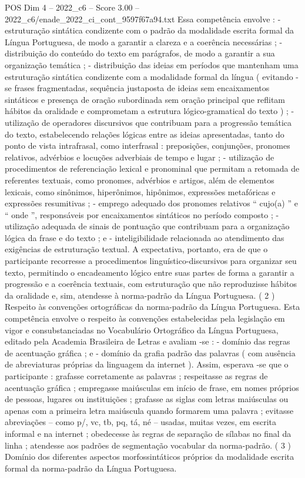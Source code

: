 \begin{textsample}{POS Dim 4 – 2022\_c6 – Score 3.00 – 2022\_c6/enade\_2022\_ci\_cont\_9597f67a94.txt}
Essa competência envolve : - estruturação sintática condizente com o padrão da modalidade escrita formal da Língua Portuguesa, de modo a garantir a clareza e a coerência necessárias ; - distribuição do conteúdo do texto em parágrafos, de modo a garantir a sua organização temática ; - distribuição das ideias em períodos que mantenham uma estruturação sintática condizente com a modalidade formal da língua ( evitando -se frases fragmentadas, sequência justaposta de ideias sem encaixamentos sintáticos e presença de oração subordinada sem oração principal que reflitam hábitos da oralidade e comprometam a estrutura lógico-gramatical do texto ) ; - utilização de operadores discursivos que contribuam para a progressão temática do texto, estabelecendo relações lógicas entre as ideias apresentadas, tanto do ponto de vista intrafrasal, como interfrasal : preposições, conjunções, pronomes relativos, advérbios e locuções adverbiais de tempo e lugar ; - utilização de procedimentos de referenciação lexical e pronominal que permitam a retomada de referentes textuais, como pronomes, advérbios e artigos, além de elementos lexicais, como sinônimos, hiperônimos, hipônimos, expressões metafóricas e expressões resumitivas ; - emprego adequado dos pronomes relativos “ cujo(a) ” e “ onde ”, responsáveis por encaixamentos sintáticos no período composto ; - utilização adequada de sinais de pontuação que contribuam para a organização lógica da frase e do texto ; e - inteligibilidade relacionada ao atendimento das exigências de estruturação textual.
A expectativa, portanto, era de que o participante recorresse a procedimentos linguístico-discursivos para organizar seu texto, permitindo o encadeamento lógico entre suas partes de forma a garantir a progressão e a coerência textuais, com estruturação que não reproduzisse hábitos da oralidade e, sim, atendesse à norma-padrão da Língua Portuguesa. ( 2 ) Respeito às convenções ortográficas da norma-padrão da Língua Portuguesa.
Esta competência envolve o respeito às convenções estabelecidas pela legislação em vigor e consubstanciadas no Vocabulário Ortográfico da Língua Portuguesa, editado pela Academia Brasileira de Letras e avaliam -se : - domínio das regras de acentuação gráfica ; e - domínio da grafia padrão das palavras ( com ausência de abreviaturas próprias da linguagem da internet ).
Assim, esperava -se que o participante : grafasse corretamente as palavras ; respeitasse as regras de acentuação gráfica ; empregasse maiúsculas em início de frase, em nomes próprios de pessoas, lugares ou instituições ; grafasse as siglas com letras maiúsculas ou apenas com a primeira letra maiúscula quando formarem uma palavra ; evitasse abreviações – como p/, vc, tb, pq, tá, né – usadas, muitas vezes, em escrita informal e na internet ; obedecesse às regras de separação de sílabas no final da linha ; atendesse aos padrões de segmentação vocabular da norma-padrão. ( 3 ) Domínio dos diferentes aspectos morfossintáticos próprios da modalidade escrita formal da norma-padrão da Língua Portuguesa.

\end{textsample}
